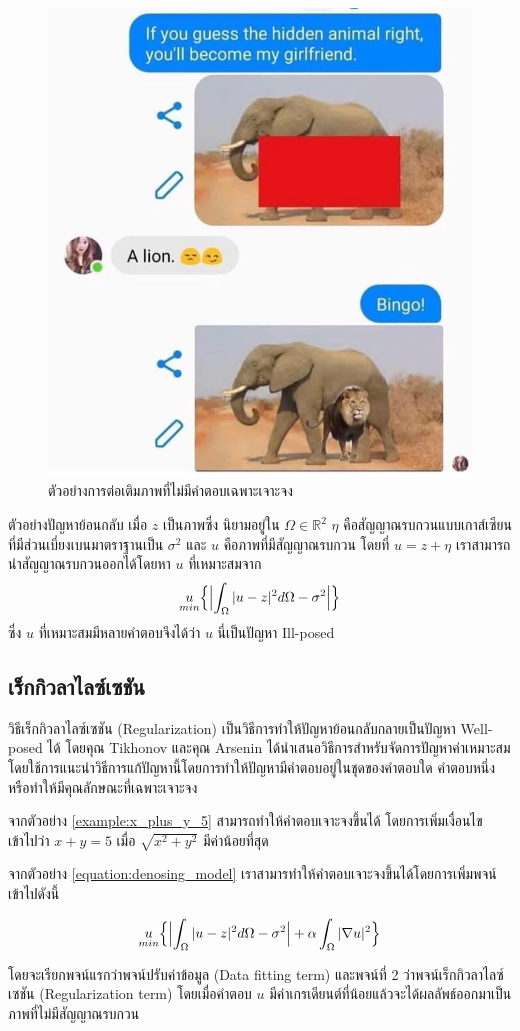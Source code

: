 \begin{figure}[H]
    \centering
    \includegraphics[width=0.35\linewidth]{image/meme_elephant.png}
    \caption[a]{ตัวอย่างการต่อเติมภาพที่ไม่มีคำตอบเฉพาะเจาะจง}
    \label{image:meme_elephant}
\end{figure}

\begin{Example}
    ตัวอย่างปัญหาย้อนกลับ เมื่อ $z$ เป็นภาพซึ่ง นิยามอยู่ใน $ \Omega \in \mathbb{R}^2$ $\eta$ คือสัญญาณรบกวนแบบเกาส์เซียนที่มีส่วนเบี่ยงเบนมาตราฐานเป็น $\sigma^2$ และ $u$ คือภาพที่มีสัญญาณรบกวน โดยที่ $u = z + \eta$ เราสามารถนำสัญญาณรบกวนออกได้โดยหา $u$ ที่เหมาะสมจาก
    \begin{align}
        \underset{min}{u} \Big\{ \Bigl| \int_{\Omega} |u-z|^2 d\Omega - \sigma^2 \Bigr| \Big\}
    \end{align}    
    ซึ่ง $u$ ที่เหมาะสมมีหลายคำตอบจึงได้ว่า $u$ นี่เป็นปัญหา Ill-posed
    \label{equation:denosing_model}
\end{Example}


\subsection{เร็กกิวลาไลซ์เซชัน}
\hspace{1cm} วิธีเร็กกิวลาไลซ์เซชัน (Regularization) เป็นวิธีการทำให้ปัญหาย้อนกลับกลายเป็นปัญหา Well-posed ได้ โดยคุณ Tikhonov และคุณ Arsenin \cite{ref:regularization} ได้นำเสนอวิธีการสำหรับจัดการปัญหาค่าเหมาะสมโดยใช้การแนะนำวิธีการแก้ปัญหานี้โดยการทำให้ปัญหามีคำตอบอยู่ในชุดของคำตอบใด คำตอบหนึ่ง หรือทำให้มีคุณลักษณะที่เฉพาะเจาะจง

\hspace{1cm} จากตัวอย่าง \ref{example:x_plus_y_5} สามารถทำให้คำตอบเจาะจงขึ้นได้ โดยการเพิ่มเงื่อนไขเข้าไปว่า $x+y=5$ เมื่อ $\sqrt{x^2+y^2}$ มีค่าน้อยที่สุด

\hspace{1cm} จากตัวอย่าง \ref{equation:denosing_model} เราสามารทำให้คำตอบเจาะจงขึ้นได้โดยการเพิ่มพจน์เข้าไปดังนี้

\begin{align}
    \underset{min}{u} \Big\{ \Bigl| \int_{\Omega} |u-z|^2 d\Omega - \sigma^2 \Bigr| + \alpha \int_{\Omega} |\nabla u|^2 \Big\}
    \label{equation:denosing_reglarization_model}
\end{align}

\hspace{1cm} โดยจะเรียกพจน์แรกว่าพจน์ปรับค่าข้อมูล (Data fitting term) และพจน์ที่ 2 ว่าพจน์เร็กกิวลาไลซ์เซชัน (Regularization term) โดยเมื่อคำตอบ $u$ มีค่าเกรเดียนต์ที่น้อยแล้วจะได้ผลลัพธ์ออกมาเป็นภาพที่ไม่มีสัญญาณรบกวน